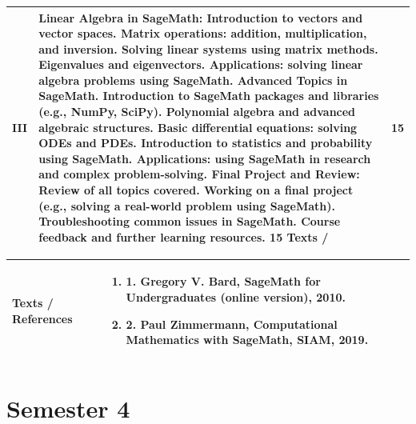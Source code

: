 \documentclass[11pt,a4paper]{article}
\begin{document}
\begin{tabularx}{\textwidth}{|>{\centering\arraybackslash}p{1.4cm}|X|>{\centering\arraybackslash}p{2.4cm}|}
\hline
\Large \textbf{III} & Linear Algebra in SageMath: Introduction to vectors and vector spaces. Matrix operations: addition, multiplication, and inversion. Solving linear systems using matrix methods. Eigenvalues and eigenvectors. Applications: solving linear algebra problems using SageMath. Advanced Topics in SageMath. Introduction to SageMath packages and libraries (e.g., NumPy, SciPy). Polynomial algebra and advanced algebraic structures. Basic differential equations: solving ODEs and PDEs. Introduction to statistics and probability using SageMath. Applications: using SageMath in research and complex problem-solving. Final Project and Review: Review of all topics covered. Working on a final project (e.g., solving a real-world problem using SageMath). Troubleshooting common issues in SageMath. Course feedback and further learning resources. 15 Texts / & \Large \textbf{15} \\
\hline
\end{tabularx}
\vspace{8pt}
\renewcommand{\arraystretch}{1.3}
\begin{tabularx}{\textwidth}{|p{3.2cm}|X|}
\hline
\textbf{Texts / References} & \begin{enumerate}[leftmargin=*,noitemsep,topsep=2pt]  \item 1. Gregory V. Bard, SageMath for Undergraduates (online version), 2010.  \item 2. Paul Zimmermann, Computational Mathematics with SageMath, SIAM, 2019.\end{enumerate} \\
\hline
\end{tabularx}
\clearpage
\section{Semester 4}
\vspace{10pt}
\clearpage
\end{document}
